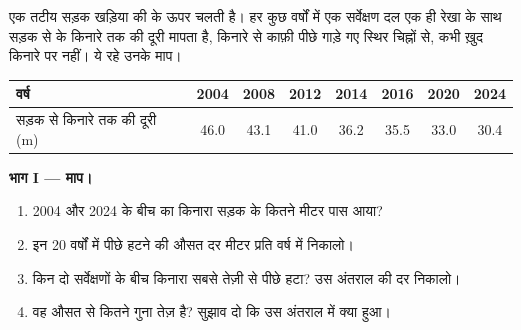 \begin{problem}
\label{pb:g9:landforms:1}
एक तटीय सड़क खड़िया की  के ऊपर चलती है। हर कुछ वर्षों में एक सर्वेक्षण दल एक ही रेखा के
साथ सड़क से  के किनारे तक की दूरी मापता है, किनारे से काफ़ी पीछे गाड़े गए स्थिर चिह्नों
से, कभी ख़ुद किनारे पर नहीं। ये रहे उनके
माप।

\begin{center}
{\small
\begin{tabular}{|l|c|c|c|c|c|c|c|}
\hline
वर्ष & 2004 & 2008 & 2012 & 2014 & 2016 & 2020 & 2024 \\
\hline
सड़क से किनारे तक की दूरी (m) & 46.0 & 43.1 & 41.0 & 36.2 & 35.5 & 33.0 & 30.4 \\
\hline
\end{tabular}}
\end{center}

\noindent\textbf{भाग I --- माप।}\par\nopagebreak
\begin{enumerate}[beginpenalty=10000]
  \item 2004 और 2024 के बीच  का किनारा सड़क के कितने मीटर पास
        आया?
  \item इन 20 वर्षों में पीछे हटने की औसत दर मीटर प्रति वर्ष में
        निकालो।
  \item किन दो सर्वेक्षणों के बीच किनारा सबसे तेज़ी से पीछे हटा? उस अंतराल की दर
        निकालो।
  \item वह औसत से कितने गुना तेज़ है? सुझाव दो कि उस अंतराल में क्या
        हुआ।
\end{enumerate}

\begin{omfigure}


\end{omfigure}
\end{problem}
